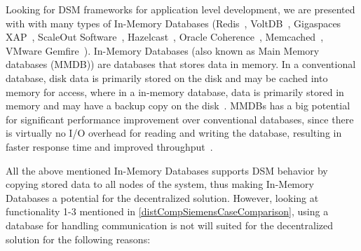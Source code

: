 Looking for DSM frameworks for application level development, we are presented with with many types of In-Memory Databases (Redis~\cite{redis}, VoltDB~\cite{voltdb}, Gigaspaces XAP~\cite{gigaspacesxap}, ScaleOut Software~\cite{scaleout}, Hazelcast~\cite{hazelcast}, Oracle Coherence~\cite{oraclecoherence}, Memcached~\cite{memcached}, VMware Gemfire~\cite{gemfire}). In-Memory Databases (also known as Main Memory databases (MMDB)) are databases that stores data in memory. In a conventional database, disk data is primarily stored on the disk and may be cached into memory for access, where in a in-memory database, data is primarily stored in memory and may have a backup copy on the disk~\cite{garcia1992main}. MMDBs has a big potential for significant performance improvement over conventional databases, since there is virtually no I/O overhead for reading and writing the database, resulting in faster response time and improved throughput~\cite{lee2001single}.

All the above mentioned In-Memory Databases supports DSM behavior by copying stored data to all nodes of the system, thus making In-Memory Databases a potential for the decentralized solution. However, looking at functionality 1-3 mentioned in \cref{distCompSiemensCaseComparison}, using a database for handling communication is not will suited for the decentralized solution for the following reasons:

